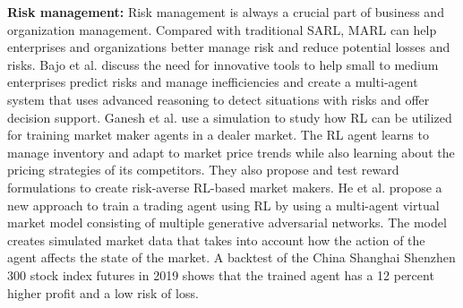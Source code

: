 \documentclass[acmsmall]{acmart}
\begin{document}
\textbf{Risk management:} 
Risk management is always a crucial part of business and organization management. Compared with traditional SARL, MARL can help enterprises and organizations better manage risk and reduce potential losses and risks.
Bajo et al. \cite{BAJO20126921} discuss the need for innovative tools to help small to medium enterprises predict risks and manage inefficiencies and create a multi-agent system that uses advanced reasoning to detect situations with risks and offer decision support. 
Ganesh et al. \cite{ganesh2019reinforcement} use a simulation to study how RL can be utilized for training market maker agents in a dealer market. The RL agent learns to manage inventory and adapt to market price trends while also learning about the pricing strategies of its competitors. They also propose and test reward formulations to create risk-averse RL-based market makers.
He et al. \cite{HE2023109985} propose a new approach to train a trading agent using RL by using a multi-agent virtual market model consisting of multiple generative adversarial networks. The model creates simulated market data that takes into account how the action of the agent affects the state of the market. 
A backtest of the China Shanghai Shenzhen 300 stock index futures in 2019 shows that the trained agent has a 12 percent higher profit and a low risk of loss.
\end{document}
